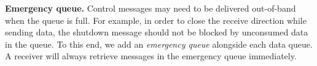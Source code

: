 \textbf{Emergency queue.}
Control messages may need to be delivered out-of-band when the queue is full. For example, in order to close the receive direction while sending data, the shutdown message should not be blocked by unconsumed data in the queue. To this end, we add an \textit{emergency queue} alongside each data queue.
A receiver will always retrieve messages in the emergency queue immediately.
\fi

